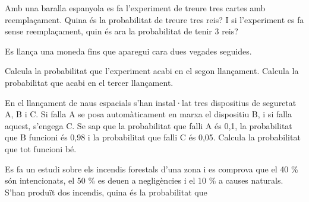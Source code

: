 \begin{mylist}
 \exer Amb una baralla espanyola es fa l'experiment de treure tres cartes amb reemplaçament.
	   Quina és la probabilitat de treure tres reis? 
	   I si l'experiment es fa sense reemplaçament, quin és ara la probabilitat de tenir 3 reis? 
 
 \answers[cols=1]{[Amb reemplaçament $P(RRR)=\frac{4}{40}\cdot \frac{4}{40} \cdot \frac{4}{40} =\frac{1}{1000}=0.001$,
 	Sense reemplaçament $P(RRR)=\frac{4}{40}\cdot \frac{3}{39} \cdot \frac{2}{38} =\frac{1}{2470}=0.0004$]}
 
 \newpage

\exer  Es llança una moneda fins que aparegui cara dues vegades seguides. 

\begin{tasks}
	\task  Calcula la probabilitat que l'experiment acabi en el segon llançament.
	\task  Calcula la probabilitat que acabi en el tercer llançament.
\end{tasks}
\answers[cols=1]{[$P(CC)=\frac{1}{4}$, $P(XCC)=\frac{1}{8}$]}
 

\exer[1]  En el llançament de naus espacials s'han instal·lat tres dispositius de seguretat A, B i C. Si falla A se posa automàticament en marxa el dispositiu B, i si falla aquest, s'engega C. Se sap que la probabilitat que falli A és 0,1, la probabilitat que B funcioni és 0,98 i la probabilitat que falli C és 0,05. Calcula la probabilitat que tot funcioni bé. 
  

 \exer Es fa un estudi sobre els incendis forestals d'una zona i es comprova que el 40 \% 
 són intencionats, el 50 \% es deuen a negligències i el 10 \% a causes naturals. 
 S'han produït dos incendis, quina és la probabilitat que


\end{mylist}
